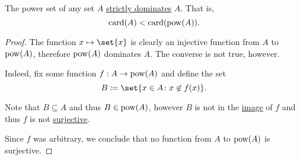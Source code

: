 \begin{theorem}\label{thm:cantor_power_set_theorem}
  The power set of any set \( A \) \hyperref[def:equinumerosity]{strictly dominates} \( A \). That is,
  \begin{equation*}
    \operatorname{card}(A) < \operatorname{card}(\operatorname{pow}(A)).
  \end{equation*}
\end{theorem}
\begin{proof}
  The function \( x \mapsto \set{ x } \) is clearly an injective function from \( A \) to \( \operatorname{pow}(A) \), therefore \( \operatorname{pow}(A) \) dominates \( A \). The converse is not true, however.

  Indeed, fix some function \( f: A \to \operatorname{pow}(A) \) and define the set
  \begin{equation*}
    B \coloneqq \set{ x \in A \colon x \not\in f(x) }.
  \end{equation*}

  Note that \( B \subseteq A \) and thus \( B \in \operatorname{pow}(A) \), however \( B \) is not in the \hyperref[def:set_valued_map/image]{image} of \( f \) and thus \( f \) is not \hyperref[def:function_invertibility/surjective]{surjective}.

  Since \( f \) was arbitrary, we conclude that no function from \( A \) to \( \operatorname{pow}(A) \) is surjective.
\end{proof}

